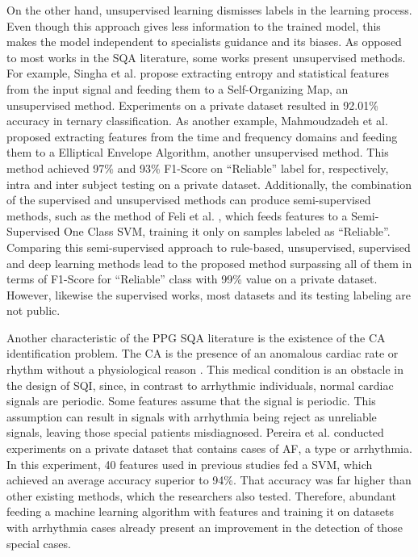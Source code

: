 On the other hand, unsupervised learning dismisses labels in the learning process. Even though this approach gives less information to the trained model, this makes the model independent to specialists guidance and its biases. As opposed to most works in the \gls{SQA} literature, some works present unsupervised methods. For example, Singha et al. \cite{ppg-sqa-4} propose extracting entropy and statistical features from the input signal and feeding them to a Self-Organizing Map, an unsupervised method. Experiments on a private dataset resulted in 92.01\% accuracy in ternary classification. As another example, Mahmoudzadeh et al. \cite{ppg-sqa-5} proposed extracting features from the time and frequency domains and feeding them to a Elliptical Envelope Algorithm, another unsupervised method. This method achieved 97\% and 93\% F1-Score on ``Reliable'' label for, respectively, intra and inter subject testing on a private dataset. Additionally, the combination of the supervised and unsupervised methods can produce semi-supervised methods, such as the method of Feli et al. \cite{ppg-sqa-6}, which feeds features to a Semi-Supervised One Class \gls{SVM}, training it only on samples labeled as ``Reliable''. Comparing this semi-supervised approach to rule-based, unsupervised, supervised and deep learning methods lead to the proposed method surpassing all of them in terms of F1-Score for ``Reliable'' class with 99\% value on a private dataset. However, likewise the supervised works, most datasets and its testing labeling are not public.		

Another characteristic of the \gls{PPG} \gls{SQA} literature is the existence of the \gls{CA} identification problem. The \gls{CA} is the presence of an anomalous cardiac rate or rhythm without a physiological reason \cite{arrhythmia-1}. This medical condition is an obstacle in the design of \gls{SQI}, since, in contrast to arrhythmic individuals, normal cardiac signals are periodic. Some features assume that the signal is periodic. This assumption can result in signals with arrhythmia being reject as unreliable signals, leaving those special patients misdiagnosed. Pereira et al. \cite{arrhythmia-2} conducted experiments on a private dataset that contains cases of \gls{AF}, a type or arrhythmia. In this experiment, 40 features used in previous studies fed a \gls{SVM}, which achieved an average accuracy superior to 94\%. That accuracy was far higher than other existing methods, which the researchers also tested. Therefore, abundant feeding a machine learning algorithm with features and training it on datasets with arrhythmia cases already present an improvement in the detection of those special cases.

